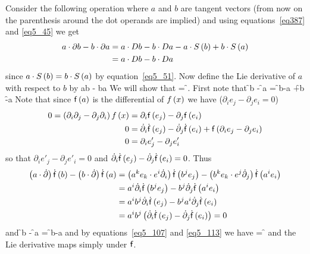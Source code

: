 Consider the following operation where $a$ and $b$ are tangent vectors (from now on the parenthesis around the dot operands are implied) and
using equations~\ref{eq387} and \ref{eq5_45} we get
\begin{align}
	a\cdot\partial b - b\cdot\partial a &= a\cdot D b - b\cdot D a - a\cdot{S}\left ( {b} \right ) + b\cdot{S}\left ( {a} \right ) \nonumber \\
	                                    &= a\cdot D b - b\cdot D a 
\end{align}
since $a\cdot{S}\left ( {b} \right ) = b\cdot{S}\left ( {a} \right )$ by equation~\ref{eq5_51}. Now define the Lie derivative of $a$ with respect to $b$ by
\be
	 \equiv a\cdot\partial b - b\cdot\partial a
\ee
We will show that
\be
  \mapsto {} = \f{\sff}{}.
\ee
First note that
\be
	\f{\sff}{b} - \f{\sff}{a} = \f{\sff}{b-a}
	                                                     +\f{\dot{\sff}}{b}
	                                                     -\f{\dot{\sff}}{a}
\ee
Note that since ${\mathsf{f}}\left ( {a} \right )$ is the differential of ${f}\left ( {x} \right )$ we have ($\partial_{i}e_{j}-\partial_{j}e_{i}=0$)
\begin{align}\label{eq5_112}
	0 = \left ( {\partial_{i}\partial_{j}-\partial_{j}\partial_{i}} \right ){f}\left ( {x} \right ) &= \partial_{i}{\mathsf{f}}\left ( {e_{j}} \right )-\partial_{j}{\mathsf{f}}\left ( {e_{i}} \right ) \nonumber \\
																	 0 &= \dot{\partial}_{i}{\dot{\mathsf{f}}}\left ( {e_{j}} \right )-\dot{\partial}_{j}{\dot{\mathsf{f}}}\left ( {e_{i}} \right )
																	     + {\mathsf{f}}\left ( {\partial_{i}e_{j}-\partial_{j}e_{i}} \right )\nonumber \\
																	 0 &= \partial_{i}e'_{j}-\partial_{j}e'_{i}
\end{align}
so that $\partial_{i}e'_{j}-\partial_{j}e'_{i} = 0$ and $\dot{\partial}_{i}{\dot{\mathsf{f}}}\left ( {e_{j}} \right )-\dot{\partial}_{j}{\dot{\mathsf{f}}}\left ( {e_{i}} \right ) = 0$.  Thus
\begin{align}
	\left ( {a\cdot\dot{\partial}} \right ){\dot{\mathsf{f}}}\left ( {b} \right )-\left ( {b\cdot\dot{\partial}} \right ){\dot{\mathsf{f}}}\left ( {a} \right ) &= 
		\left ( {a^{k}e_{k}\cdot e^{i}\dot{\partial}_{i}} \right ){\dot{\mathsf{f}}}\left ( {b^{j}e_{j}} \right )
	   -\left ( {b^{k}e_{k}\cdot e^{j}\dot{\partial}_{j}} \right ){\dot{\mathsf{f}}}\left ( {a^{i}e_{i}} \right ) \nonumber \\
	&= a^{i}\dot{\partial}_{i}{\dot{\mathsf{f}}}\left ( {b^{j}e_{j}} \right )-b^{j}\dot{\partial}_{j}{\dot{\mathsf{f}}}\left ( {a^{i}e_{i}} \right ) \nonumber \\
	&= a^{i}b^{j}\dot{\partial}_{i}{\dot{\mathsf{f}}}\left ( {e_{j}} \right )-b^{j}a^{i}\dot{\partial}_{j}{\dot{\mathsf{f}}}\left ( {e_{i}} \right ) \nonumber \\
	&= a^{i}b^{j}\left ( {\dot{\partial}_{i}{\dot{\mathsf{f}}}\left ( {e_{j}} \right )-\dot{\partial}_{j}{\dot{\mathsf{f}}}\left ( {e_{i}} \right )} \right ) = 0
\end{align}
and
\be\label{eq5_113}
\f{\sff}{b} - \f{\sff}{a} = \f{\sff}{b-a}
\ee
and by equations~\ref{eq5_107} and \ref{eq5_113} we have
\be
  = \f{\sff}{}
\ee
and the Lie derivative maps simply under $\mathsf{f}$.


